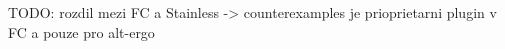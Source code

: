 



TODO: rozdil mezi FC a Stainless -> counterexamples je prioprietarni plugin v FC a pouze pro alt-ergo
